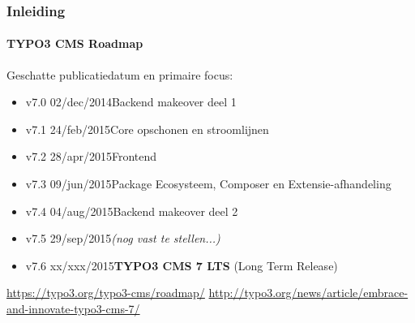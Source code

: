 \begin{frame}[fragile]
	\frametitle{Inleiding}
	\framesubtitle{TYPO3 CMS Roadmap}

	Geschatte publicatiedatum en primaire focus:

	\begin{itemize}
		\item v7.0 \tabto{1.0cm}02/dec/2014\tabto{3.4cm}Backend makeover deel 1
		\item v7.1 \tabto{1.0cm}24/feb/2015\tabto{3.4cm}Core opschonen en stroomlijnen

		\item
			\begingroup
				\color{typo3orange}
					v7.2 \tabto{1.0cm}28/apr/2015\tabto{3.4cm}Frontend
			\endgroup

		\item v7.3 \tabto{1.0cm}09/jun/2015\tabto{3.4cm}Package Ecosysteem, Composer\newline
			\tabto{3.4cm}en Extensie-afhandeling
		\item v7.4 \tabto{1.0cm}04/aug/2015\tabto{3.4cm}Backend makeover deel 2
		\item v7.5 \tabto{1.0cm}29/sep/2015\tabto{3.4cm}\textit{(nog vast te stellen...)}
		\item v7.6 \tabto{1.0cm}xx/xxx/2015\tabto{3.4cm}\textbf{TYPO3 CMS 7 LTS} (Long Term Release)
	\end{itemize}

	\smaller
		\url{https://typo3.org/typo3-cms/roadmap/}\newline
		\url{http://typo3.org/news/article/embrace-and-innovate-typo3-cms-7/}
	\normalsize

\end{frame}

